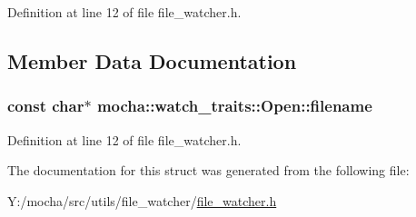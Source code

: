 Definition at line 12 of file file\_\-watcher.h.



\subsection{Member Data Documentation}
\hypertarget{structmocha_1_1watch__traits_1_1_open_a3c234f7b7822de3b7a6c04cb5043a629}{
\subsubsection[{filename}]{\setlength{\rightskip}{0pt plus 5cm}const char$\ast$ {\bf mocha::watch\_\-traits::Open::filename}}}
\label{structmocha_1_1watch__traits_1_1_open_a3c234f7b7822de3b7a6c04cb5043a629}


Definition at line 12 of file file\_\-watcher.h.



The documentation for this struct was generated from the following file:\begin{DoxyCompactItemize}
\item 
Y:/mocha/src/utils/file\_\-watcher/\hyperlink{file__watcher_8h}{file\_\-watcher.h}\end{DoxyCompactItemize}
